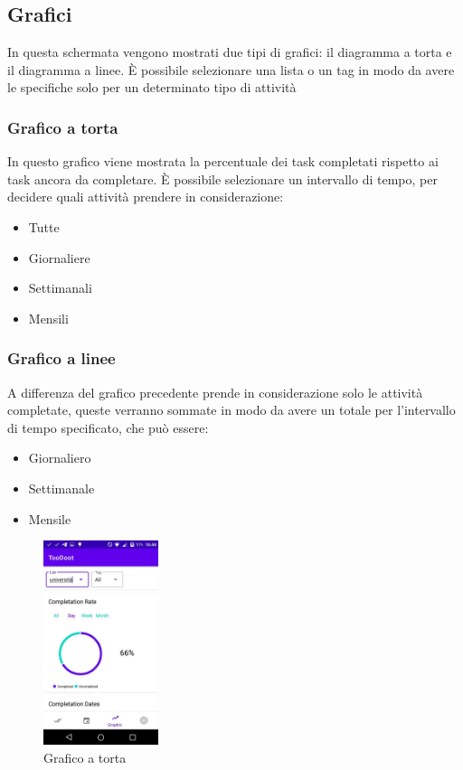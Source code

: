 \documentclass[]{article}
\providecommand{\tightlist}{%
  \setlength{\itemsep}{0pt}\setlength{\parskip}{0pt}}
\begin{document}
\hypertarget{grafici}{%
\subsection{Grafici}\label{grafici}}

In questa schermata vengono mostrati due tipi di grafici: il diagramma a
torta e il diagramma a linee. È possibile selezionare una lista o un tag
in modo da avere le specifiche solo per un determinato tipo di attività

\hypertarget{grafico-a-torta}{%
\subsubsection{Grafico a torta}\label{grafico-a-torta}}

In questo grafico viene mostrata la percentuale dei task completati
rispetto ai task ancora da completare. È possibile selezionare un
intervallo di tempo, per decidere quali attività prendere in
considerazione:

\begin{itemize}
\tightlist
\item
  Tutte
\item
  Giornaliere
\item
  Settimanali
\item
  Mensili
\end{itemize}

\hypertarget{grafico-a-linee}{%
\subsubsection{Grafico a linee}\label{grafico-a-linee}}

A differenza del grafico precedente prende in considerazione solo le
attività completate, queste verranno sommate in modo da avere un totale
per l'intervallo di tempo specificato, che può essere:

\begin{itemize}
\tightlist
\item
  Giornaliero
\item
  Settimanale
\item
  Mensile
\end{itemize}

\begin{figure}
\centering
\includegraphics[width=0.3\textwidth,height=0.1\textheight]{./img/grafico_torta.jpg}
\caption{Grafico a torta}
\end{figure}
\end{document}
